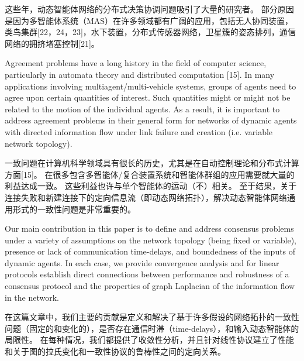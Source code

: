 \documentclass{article}
\begin{document}
\noindent 这些年，动态智能体网络的分布式决策协调问题吸引了大量的研究者。
部分原因是因为多智能体系统（MAS）在许多领域都有广阔的应用，包括无人协同装置，类鸟集群[22，24，23]，水下装置，分布式传感器网络，卫星簇的姿态排列，通信网络的拥挤堵塞控制[21]。

{\color[gray]{0.5}
Agreement problems have a long history in the ﬁeld of computer science, particularly in automata theory and distributed computation [15]. 
In many applications involving multiagent/multi-vehicle systems, groups of agents need to agree upon certain quantities of interest. 
Such quantities might or might not be related to the motion of the individual agents. 
As a result, it is important to address agreement problems in their general form for networks of dynamic agents with directed information ﬂow under link failure and creation (i.e. variable network topology).
}

一致问题在计算机科学领域具有很长的历史，尤其是在自动控制理论和分布式计算方面[15]。
在很多包含多智能体/复合装置系统和智能体群组的应用需要就大量的利益达成一致。
这些利益也许与单个智能体的运动（不）相关。
至于结果，关于连接失败和新建连接下的定向信息流（即动态网络拓扑），解决动态智能体网络通用形式的一致性问题是非常重要的。

{\color[gray]{0.5}
Our main contribution in this paper is to deﬁne and address consensus problems under a variety of assumptions on the network topology (being ﬁxed or variable), presence or lack of communication time-delays, and boundedness of the inputs of dynamic agents. 
In each case, we provide convergence analysis and for linear protocols establish direct connections between performance and robustness of a consensus protocol and the properties of graph Laplacian of the information ﬂow in the network.
}

在这篇文章中，我们主要的贡献是定义和解决了基于许多假设的网络拓扑的一致性问题（固定的和变化的），是否存在通信时滞（time-delays），和输入动态智能体的局限性。
在每种情况，我们都提供了收敛性分析，并且针对线性协议建立了性能和关于图的拉氏变化和一致性协议的鲁棒性之间的定向关系。
\end{document}
